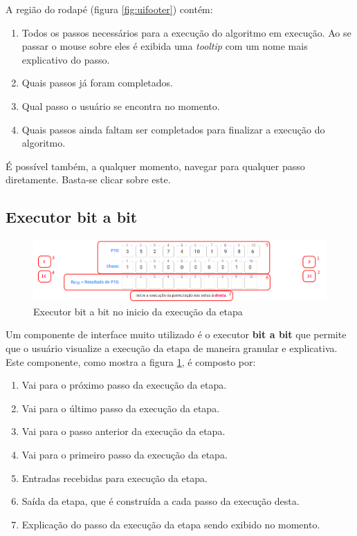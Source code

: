A região do rodapé (figura \ref{fig:uifooter}) contém:
\begin{enumerate}
    \item Todos os passos necessários para a execução do algoritmo em execução. Ao se passar o mouse sobre eles é exibida uma \textit{tooltip} com um nome mais explicativo do passo.
    \item Quais passos já foram completados.
    \item Qual passo o usuário se encontra no momento.
    \item Quais passos ainda faltam ser completados para finalizar a execução do algoritmo.
\end{enumerate}
É possível também, a qualquer momento, navegar para qualquer passo diretamente. Basta-se clicar sobre este.

\subsection{Executor bit a bit}

\begin{figure}[H]
    \centering
    \caption{Executor bit a bit no inicio da execução da etapa}
    \label{fig:uibitabit}
    \includegraphics[width=1\linewidth]{UI/UIBitABit.png}
\end{figure}

Um componente de interface muito utilizado é o executor \textbf{bit a bit} que permite que o usuário visualize a execução da etapa de maneira granular e explicativa. Este componente, como mostra a figura \ref{fig:uibitabit}, é composto por:
\begin{enumerate}
    \item Vai para o próximo passo da execução da etapa.
    \item Vai para o último passo da execução da etapa.
    \item Vai para o passo anterior da execução da etapa.
    \item Vai para o primeiro passo da execução da etapa.
    \item Entradas recebidas para execução da etapa.
    \item Saída da etapa, que é construída a cada passo da execução desta.
    \item Explicação do passo da execução da etapa sendo exibido no momento.
\end{enumerate}

